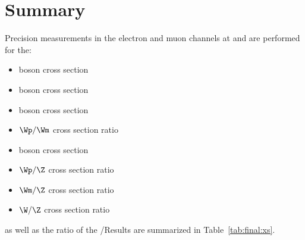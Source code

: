 \chapter{Summary}
Precision measurements in the electron and muon channels at \sg and \sh are performed for the:
\begin{itemize}
    \item \Wp boson cross section
    \item \Wm boson cross section
    \item \W boson cross section
    \item $\Wp/\Wm$ cross section ratio
    \item \Z boson cross section
    \item $\Wp/\Z$ cross section ratio
    \item $\Wm/\Z$ cross section ratio
    \item $\W/\Z$ cross section ratio
\end{itemize}
as well as the ratio of the \sg/\sh Results are summarized in Table~\ref{tab:final:xs}.